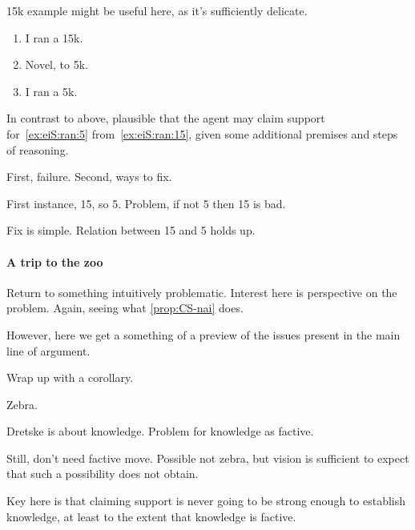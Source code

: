 \begin{note}
  15k example might be useful here, as it's sufficiently delicate.

  \begin{enumerate}[label=\arabic*., ref=(\arabic*)]
  \item\label{ex:eiS:ran:15} I ran a 15k.
  \item Novel, to 5k.
  \item\label{ex:eiS:ran:5} I ran a 5k.
  \end{enumerate}

  In contrast to above, plausible that the agent may claim support for~\ref{ex:eiS:ran:5} from~\ref{ex:eiS:ran:15}, given some additional premises and steps of reasoning.

  First, failure.
  Second, ways to fix.

  First instance, 15, so 5.
  Problem, if not 5 then 15 is bad.

  Fix is simple.
  Relation between 15 and 5 holds up.
\end{note}

\paragraph{A trip to the zoo}

\begin{note}
  Return to something intuitively problematic.
  Interest here is perspective on the problem.
  Again, seeing what \autoref{prop:CS-nai} does.

  However, here we get a something of a preview of the issues present in the main line of argument.

  Wrap up with a corollary.
\end{note}

\begin{note}
  Zebra.

  Dretske is about knowledge.
  Problem for knowledge as factive.

  Still, don't need factive move.
  Possible not zebra, but vision is sufficient to expect that such a possibility does not obtain.

  Key here is that claiming support is never going to be strong enough to establish knowledge, at least to the extent that knowledge is factive.
\end{note}

